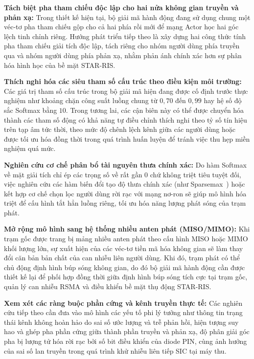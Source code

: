 \textbf{Tách biệt pha tham chiếu độc lập cho hai nửa không gian truyền và phản xạ:} Trong thiết kế hiện tại, bộ
giải mã hành động đang sử dụng chung một véc-tơ pha tham chiếu gộp cho cả hai phía rồi mới để mạng Actor học hai góc
lệch tinh chỉnh riêng. Hướng phát triển tiếp theo là xây dựng hai công thức tính pha tham chiếu giải tích độc lập,
tách riêng cho nhóm người dùng phía truyền qua và nhóm người dùng phía phản xạ, nhằm phản ánh chính xác hơn sự phân
hóa hình học của bề mặt STAR-RIS.

\textbf{Thích nghi hóa các siêu tham số cấu trúc theo điều kiện môi trường:} Các giá trị tham số cấu trúc trong bộ
giải mã hiện đang được cố định trước thực nghiệm như khoảng chặn công suất luồng chung từ $0,70$ đến $0,99$ hay hệ số
độ sắc Softmax bằng $10$. Trong tương lai, các cận biên này có thể được chuyển hóa thành các tham số động có khả năng
tự điều chỉnh thích nghi theo tỷ số tín hiệu trên tạp âm tức thời, theo mức độ chênh lệch kênh giữa các người dùng
hoặc được tối ưu hóa đồng thời trong quá trình huấn luyện để tránh việc thu hẹp miền nghiệm quá mức.

\textbf{Nghiên cứu cơ chế phân bổ tài nguyên thưa chính xác:} Do hàm Softmax về mặt giải tích chỉ ép các trọng số về
rất gần $0$ chứ không triệt tiêu tuyệt đối, việc nghiên cứu các hàm biến đổi tạo độ thưa chính xác (như
Sparsemax~\cite{Martins2016Sparsemax}) hoặc kết hợp cơ chế chọn lọc người dùng rời rạc với mạng nơ-ron sẽ giúp mô
hình hóa triệt để cấu hình tắt hẳn luồng riêng, tối ưu hóa năng lượng phát sóng của trạm phát.

\textbf{Mở rộng mô hình sang hệ thống nhiều anten phát (MISO/MIMO):} Khi trạm gốc được trang bị mảng nhiều anten phát
theo cấu hình MISO hoặc MIMO khối lượng lớn, sự xuất hiện của các véc-tơ tiền mã hóa không gian sẽ làm thay đổi căn
bản bản chất của can nhiễu liên người dùng. Khi đó, trạm phát có thể chủ động định hình búp sóng không gian, do đó bộ
giải mã hành động cần được thiết kế lại để phối hợp đồng thời giữa định hình búp sóng tích cực tại trạm gốc, quản lý
can nhiễu RSMA và điều khiển bề mặt thụ động STAR-RIS.

\textbf{Xem xét các ràng buộc phần cứng và kênh truyền thực tế:} Các nghiên cứu tiếp theo cần đưa vào mô hình các
yếu tố phi lý tưởng như thông tin trạng thái kênh không hoàn hảo do sai số ước lượng và trễ phản hồi, hiện tượng suy
hao và ghép pha phần cứng giữa thành phần truyền và phản xạ, độ phân giải góc pha bị lượng tử hóa rời rạc bởi số bit
điều khiển của diode PIN, cùng ảnh hưởng của sai số lan truyền trong quá trình khử nhiễu liên tiếp SIC tại máy thu.

